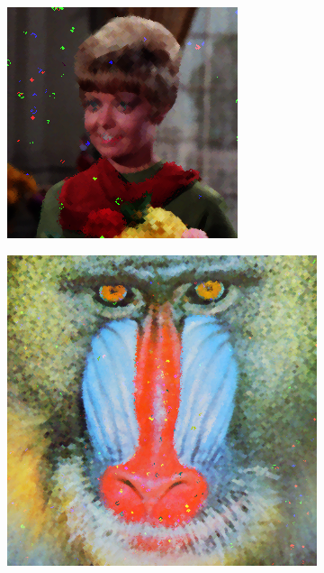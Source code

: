 \begin{subfigure}{0.9\textwidth}
\begin{subfigure}[t]{0.15\textwidth}
    \centering
  \end{subfigure}
\begin{subfigure}[t]{0.15\textwidth}
    \includegraphics[width=0.9\linewidth]{../images/outputs/denoise/co/co2.png}
    
    \centering
  \end{subfigure}
\begin{subfigure}[t]{0.15\textwidth}
    \includegraphics[width=0.9\linewidth]{../images/outputs/denoise/co/co3.png}
    

\end{subfigure}
\end{subfigure}
